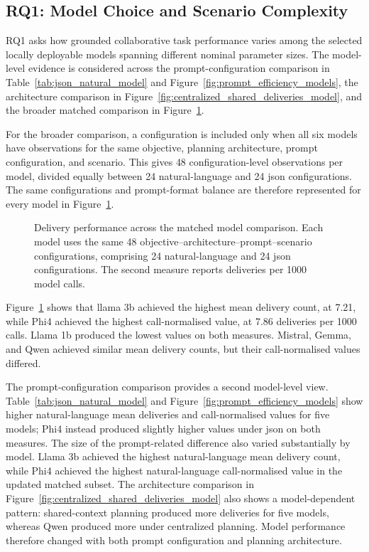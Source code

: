 \subsection{RQ1: Model Choice and Scenario Complexity}
\label{sec:results_model_choice}

RQ1 asks how grounded collaborative task performance varies among the selected locally deployable models spanning different nominal parameter sizes. The model-level evidence is considered across the prompt-configuration comparison in Table~\ref{tab:json_natural_model} and Figure~\ref{fig:prompt_efficiency_models}, the architecture comparison in Figure~\ref{fig:centralized_shared_deliveries_model}, and the broader matched comparison in Figure~\ref{fig:model_matched_performance}.

For the broader comparison, a configuration is included only when all six models have observations for the same objective, planning architecture, prompt configuration, and scenario. This gives 48 configuration-level observations per model, divided equally between 24 natural-language and 24 \gls{json} configurations. The same configurations and prompt-format balance are therefore represented for every model in Figure~\ref{fig:model_matched_performance}.

\begin{figure}[H]
\centering
\ChartMatchedModels
\caption{Delivery performance across the matched model comparison. Each model uses the same 48 objective--architecture--prompt--scenario configurations, comprising 24 natural-language and 24 \gls{json} configurations. The second measure reports deliveries per 1000 model calls.}
\label{fig:model_matched_performance}
\end{figure}

Figure~\ref{fig:model_matched_performance} shows that llama 3b achieved the highest mean delivery count, at 7.21, while Phi4 achieved the highest call-normalised value, at 7.86 deliveries per 1000 calls. Llama 1b produced the lowest values on both measures. Mistral, Gemma, and Qwen achieved similar mean delivery counts, but their call-normalised values differed.

The prompt-configuration comparison provides a second model-level view. Table~\ref{tab:json_natural_model} and Figure~\ref{fig:prompt_efficiency_models} show higher natural-language mean deliveries and call-normalised values for five models; Phi4 instead produced slightly higher values under \gls{json} on both measures. The size of the prompt-related difference also varied substantially by model. Llama 3b achieved the highest natural-language mean delivery count, while Phi4 achieved the highest natural-language call-normalised value in the updated matched subset. The architecture comparison in Figure~\ref{fig:centralized_shared_deliveries_model} also shows a model-dependent pattern: shared-context planning produced more deliveries for five models, whereas Qwen produced more under centralized planning. Model performance therefore changed with both prompt configuration and planning architecture.

